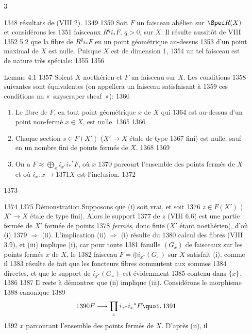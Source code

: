 3	\documentclass[10pt]{../fichiers-configuration-latex/smfart}
\begin{document}
  1348	résultats de (VIII 2).
  1349	
  1350	Soit $F$ un faisceau abélien sur $\Spec R(X)$ et considérons les
  1351	faisceaux $R^qi_{\ast}F$, $q>0$, sur $X$. Il résulte aussitôt de VIII
  1352	5.2 que la fibre de $R^qi_{\ast}F$ en un point géométrique au-dessus
  1353	d'un point maximal de $X$ est nulle. Puisque $X$ est de dimension 1,
  1354	un tel faisceau est de nature très spéciale:
  1355	
  1356	\begin{enonce*}{Lemme 4.1}
  1357	Soient $X$ noethérien et $F$ un faisceau sur $X$. Les conditions
  1358	suivantes sont équivalentes (on appellera un faisceau satisfaisant à
  1359	ces conditions un « skyscraper sheaf »):
  1360	\begin{enumerate}
  1361	\renewcommand{\theenumi}{\roman{enumi}}
  1362	\renewcommand{\labelenumi}{(\theenumi)}
  1363	\item Le fibre de $F$, en tout point géométrique $\bar{x}$ de $X$ qui
  1364	est au-dessus d'un point non-fermé $x\in X$, est nulle.
  1365	
  1366	\item Chaque section $s\in F(X')$ ($X'\rightarrow X$ étale de type
  1367	fini) est nulle, sauf en un nombre fini de points fermés de $X$.
  1368	
  1369	\item On a $F\approx ⨁_x i_{x^{\ast}}i_{\ast}{}^{\ast}F$, où $x$
  1370	parcourt l'ensemble des points fermés de $X$ et où $i_x:x\rightarrow
  1371	X$ est l'inclusion.
  1372	\end{enumerate}
  1373	\end{enonce*}
  1374	
  1375	Démonstration.\pageoriginale Supposons que (i) soit vrai, et soit
  1376	$z\in F(X')$ ($X'\rightarrow X$ étale de type fini). Alors le support
  1377	de $z$ (VIII 6.6) est une partie fermée de $X'$ formée de points
  1378	\emph{fermés}, donc finie ($X'$ étant noethérien), d'où (i)
  1379	$\Rightarrow$ (ii). L'implication (ii) $\Rightarrow$ (i) résulte du
  1380	calcul des fibres (VIII 3.9), et (iii) implique (i), car pour toute
  1381	famille $(G_x)$ de faisceaux sur les points fermés $x$ de $X$, le
  1382	faisceau $F=\oplus i_{x^{\ast}}(G_x)$ sur $X$ satisfait (i), comme il
  1383	résulte de fait que les foncteurs fibres commutent aux sommes
  1384	directes, et que le support de $i_{x^{\ast}}(G_x)$ est évidemment
  1385	contenu dans $\{x\}$.
  1386	
  1387	Il reste à démontrer que (ii) implique (iii). Considérons le morphisme
  1388	canonique
  1389	$$
  1390	F\longrightarrow \prod_x i_{x^{\ast}}i_{x}{}^\ast F{\quoi},
  1391	$$
  1392	$x$ parcourant l'ensemble des points fermés de $X$. D'après (ii), il
\end{document}

